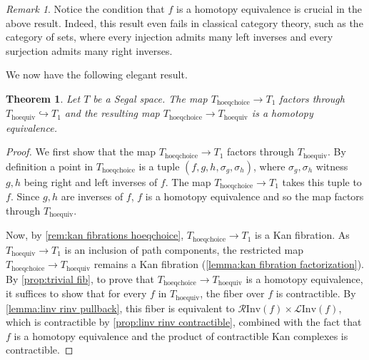 \documentclass[11pt, a4paper]{amsart}
\newcommand{\hoequiv}{\mathrm{hoequiv}}
\newcommand{\hoeqchoice}{\mathrm{hoeqchoice}}
\newcommand{\LInv}{\mathscr{L}\mathrm{Inv}}
\newcommand{\RInv}{\mathscr{R}\mathrm{Inv}}
\newtheorem{theorem}[equation]{Theorem}
\theoremstyle{definition}
\theoremstyle{remark}
\newtheorem{remark}[equation]{Remark}
\numberwithin{equation}{section}
\begin{document}
\begin{remark}
  Notice the condition that $f$ is a homotopy equivalence is crucial in the above result. Indeed, this result even fails in classical category theory, such as the category of sets, where every injection admits many left inverses and every surjection admits many right inverses. 
\end{remark}

We now have the following elegant result.

 \begin{theorem} \label{thm:hoeqchoice is hoequiv}
   Let $T$ be a Segal space. The map $T_{\hoeqchoice} \to T_1$ factors through $T_{\hoequiv} \hookrightarrow T_1$ and the resulting map $T_{\hoeqchoice} \to T_{\hoequiv}$ is a homotopy equivalence. 
 \end{theorem}

\begin{proof}
  We first show that the map $T_{\hoeqchoice} \to T_1$ factors through $T_{\hoequiv}$. By definition a point in $T_{\hoeqchoice}$ is a tuple $(f,g,h, \sigma_g,\sigma_h)$, where $\sigma_g,\sigma_h$ witness $g,h$ being right and left inverses of $f$. The map $T_{\hoeqchoice} \to T_1$ takes this tuple to $f$. Since $g,h$ are inverses of $f$, $f$ is a homotopy equivalence and so the map factors through $T_{\hoequiv}$. 
  
  Now, by \cref{rem:kan fibrations hoeqchoice}, $T_{\hoeqchoice} \to T_1$ is a Kan fibration. As $T_{\hoequiv} \to T_1$ is an inclusion of path components, the restricted map $T_{\hoeqchoice} \to T_{\hoequiv}$ remains a Kan fibration (\cref{lemma:kan fibration factorization}). By \cref{prop:trivial fib}, to prove that $T_{\hoeqchoice} \to T_{\hoequiv}$ is a homotopy equivalence, it suffices to show that for every $f$ in $T_{\hoequiv}$, the fiber over $f$ is contractible. By \cref{lemma:linv rinv pullback}, this fiber is equivalent to $\RInv(f) \times \LInv(f)$, which is contractible by \cref{prop:linv rinv contractible}, combined with the fact that $f$ is a homotopy equivalence and the product of contractible Kan complexes is contractible.
\end{proof}
\end{document}
